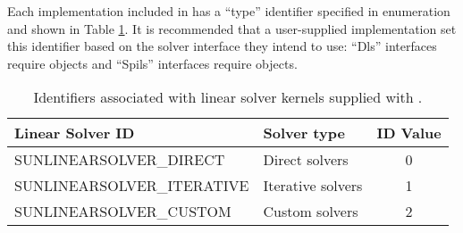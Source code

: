 Each {\sunlinsol} implementation included in {\sundials} has a ``type''
identifier specified in enumeration and shown in Table \ref{t:linsolIDs}.
It is recommended that a user-supplied {\sunlinsol} implementation set
this identifier based on the {\sundials} solver interface they intend
to use: ``Dls'' interfaces require 
{\sunlinsol} objects and ``Spils'' interfaces require 
 objects. 

\begin{table}
\centering
\caption{Identifiers associated with linear solver kernels supplied with {\sundials}.}
\label{t:linsolIDs}
\medskip
\begin{tabular}{|l|l|c|}
\hline
{\bf Linear Solver ID} & {\bf Solver type} & {\bf ID Value} \\
\hline
SUNLINEARSOLVER\_DIRECT      & Direct solvers     & 0 \\ 
SUNLINEARSOLVER\_ITERATIVE   & Iterative solvers  & 1 \\
SUNLINEARSOLVER\_CUSTOM      & Custom solvers     & 2 \\
\hline
\end{tabular}
\end{table}





\newlength{\colOne}
\newlength{\colTwo}
\setlength{\colTwo}{\textwidth}
\addtolength{\colTwo}{-0.5in}
\addtolength{\colTwo}{-\colOne}

